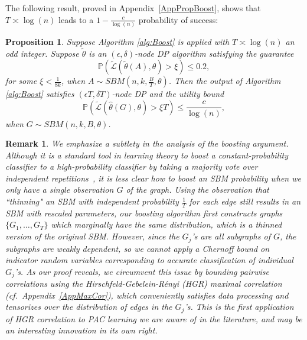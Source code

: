 \documentclass{article}
\newtheorem{remark}{Remark}
\newtheorem{proposition}{Proposition}
\newcommand{\mprob}{\mathbb{P}}
\newcommand{\thetahat}{\ensuremath{\widehat{\theta}}}
\begin{document}
The following result, proved in Appendix~\ref{AppPropBoost}, shows that $T \asymp \log(n)$ leads to a $1-\frac{c}{\log(n)}$ probability of success: 

\begin{proposition}
\label{prop:Boost_result}
Suppose Algorithm \ref{alg:Boost} is applied with $T \asymp \log(n)$ an odd integer. Suppose $\widetilde{\theta}$ is an $(\epsilon, \delta)$-node DP algorithm satisfying the guarantee
\begin{equation}
\label{EqnConstBd}
\mprob(\widetilde{\mathcal{L}}(\widetilde{\theta}(A), \theta) > \xi) \le 0.2,
\end{equation}
for some $\xi < \frac{1}{8k}$, when $A \sim SBM(n, k, \frac{B}{T}, \theta)$. Then the output of Algorithm \ref{alg:Boost} satisfies $(\epsilon T, \delta T)$-node DP and the utility bound
\begin{equation*}
\mprob(\widetilde{\mathcal{L}}(\thetahat(G), \theta) > \xi T) \le \frac{c}{\log(n)},
\end{equation*}
when $G \sim SBM(n, k, B, \theta)$.
\end{proposition}

\begin{remark}
We emphasize a subtlety in the analysis of the boosting argument. Although it is a standard tool in learning theory to boost a constant-probability classifier to a high-probability classifier by taking a majority vote over independent repetitions~\cite{shalev2014understanding}, it is less clear how to boost an SBM probability when we only have a single observation $G$ of the graph. Using the observation that ``thinning" an SBM with independent probability $\frac{1}{T}$ for each edge still results in an SBM with rescaled parameters, our boosting algorithm first constructs graphs $\{G_1, \dots, G_T\}$ which marginally have the same distribution, which is a thinned version of the original SBM. However, since the $G_j$'s are all subgraphs of $G$, the subgraphs are weakly dependent, so we cannot apply a Chernoff bound on indicator random variables corresponding to accurate classification of individual $G_j$'s. As our proof reveals, we circumvent this issue by bounding pairwise correlations using the Hirschfeld-Gebelein-R\'{e}nyi (HGR) maximal correlation (cf.\ Appendix~\ref{AppMaxCor}), which conveniently satisfies data processing and tensorizes over the distribution of edges in the $G_j$'s. This is the first application of HGR correlation to PAC learning we are aware of in the literature, and may be an interesting innovation in its own right.
\end{remark}
\end{document}
